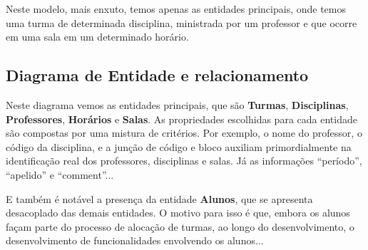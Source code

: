 Neste modelo, mais enxuto, temos apenas as entidades principais, onde temos uma turma de determinada disciplina, ministrada por um professor e que ocorre em uma sala em um determinado horário.

\subsection{Diagrama de Entidade e relacionamento} %



Neste diagrama vemos as entidades principais, que são \textbf{Turmas}, \textbf{Disciplinas}, \textbf{Professores}, \textbf{Horários} e \textbf{Salas}. As propriedades escolhidas para cada entidade são compostas por uma mistura de critérios. Por exemplo, o nome do professor, o código da disciplina, e a junção de código e bloco auxiliam primordialmente na identificação real dos professores, disciplinas e salas. Já as informações ``período'', ``apelido'' e ``comment''...

E também é notável a presença da entidade \textbf{Alunos}, que se apresenta desacoplado das demais entidades. O motivo para isso é que, embora os alunos façam parte do processo de alocação de turmas, ao longo do desenvolvimento, o desenvolvimento de funcionalidades envolvendo os alunos...
